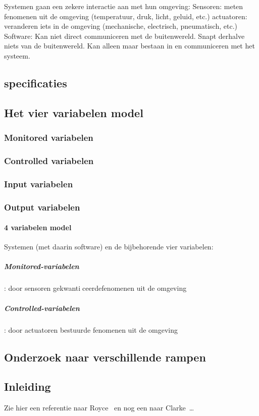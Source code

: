 \documentclass{article}
\begin{document}
Systemen gaan een zekere interactie aan met hun omgeving:
Sensoren: meten fenomenen uit de omgeving (temperatuur,
druk, licht, geluid, etc.)
actuatoren: veranderen iets in de omgeving (mechanische,
electrisch, pneumatisch, etc.)
Software:
Kan niet direct communiceren met de buitenwereld.
Snapt derhalve niets van de buitenwereld.
Kan alleen maar bestaan in en communiceren met het
systeem.




\subsection{specificaties}

\subsection{Het vier variabelen model}
\subsubsection{Monitored variabelen}
\subsubsection{Controlled variabelen}
\subsubsection{Input variabelen}
\subsubsection{Output variabelen}


\paragraph{4 variabelen model}
Systemen (met daarin software) en de bijbehorende vier variabelen:
\subparagraph{Monitored-variabelen}: door sensoren gekwanticeerdefenomenen uit de omgeving
\subparagraph{Controlled-variabelen}: door actuatoren bestuurde fenomenen uit de omgeving




\newpage

\subsection{Onderzoek naar verschillende rampen}

\subsection{Inleiding}
Zie hier een referentie naar Royce~\cite{royce1987managing} en nog een naar Clarke~\cite{modelchecking}\ldots 
\end{document}
